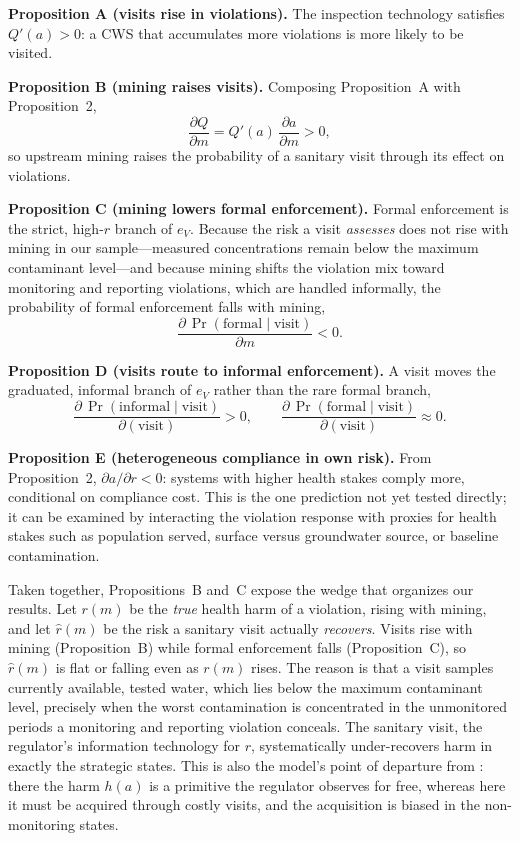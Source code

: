 \medskip
\noindent\textbf{Proposition A (visits rise in violations).} The inspection technology satisfies $Q'(a) > 0$: a CWS that accumulates more violations is more likely to be visited.

\medskip
\noindent\textbf{Proposition B (mining raises visits).} Composing Proposition~A with Proposition~2,
\[
\frac{\partial Q}{\partial m} = Q'(a)\,\frac{\partial a}{\partial m} > 0 ,
\]
so upstream mining raises the probability of a sanitary visit through its effect on violations.

\medskip
\noindent\textbf{Proposition C (mining lowers formal enforcement).} Formal enforcement is the strict, high-$r$ branch of $e_V$. Because the risk a visit \emph{assesses} does not rise with mining in our sample---measured concentrations remain below the maximum contaminant level---and because mining shifts the violation mix toward monitoring and reporting violations, which are handled informally, the probability of formal enforcement falls with mining,
\[
\frac{\partial\,\Pr(\text{formal}\mid\text{visit})}{\partial m} < 0 .
\]

\medskip
\noindent\textbf{Proposition D (visits route to informal enforcement).} A visit moves the graduated, informal branch of $e_V$ rather than the rare formal branch,
\[
\frac{\partial\,\Pr(\text{informal}\mid\text{visit})}{\partial(\text{visit})} > 0, \qquad \frac{\partial\,\Pr(\text{formal}\mid\text{visit})}{\partial(\text{visit})} \approx 0 .
\]

\medskip
\noindent\textbf{Proposition E (heterogeneous compliance in own risk).} From Proposition~2, $\partial a/\partial r < 0$: systems with higher health stakes comply more, conditional on compliance cost. This is the one prediction not yet tested directly; it can be examined by interacting the violation response with proxies for health stakes such as population served, surface versus groundwater source, or baseline contamination.

\medskip
Taken together, Propositions~B and~C expose the wedge that organizes our results. Let $r(m)$ be the \emph{true} health harm of a violation, rising with mining, and let $\hat{r}(m)$ be the risk a sanitary visit actually \emph{recovers}. Visits rise with mining (Proposition~B) while formal enforcement falls (Proposition~C), so $\hat{r}(m)$ is flat or falling even as $r(m)$ rises. The reason is that a visit samples currently available, tested water, which lies below the maximum contaminant level, precisely when the worst contamination is concentrated in the unmonitored periods a monitoring and reporting violation conceals. The sanitary visit, the regulator's information technology for $r$, systematically under-recovers harm in exactly the strategic states. This is also the model's point of departure from \cite{kang2021understanding}: there the harm $h(a)$ is a primitive the regulator observes for free, whereas here it must be acquired through costly visits, and the acquisition is biased in the non-monitoring states.

